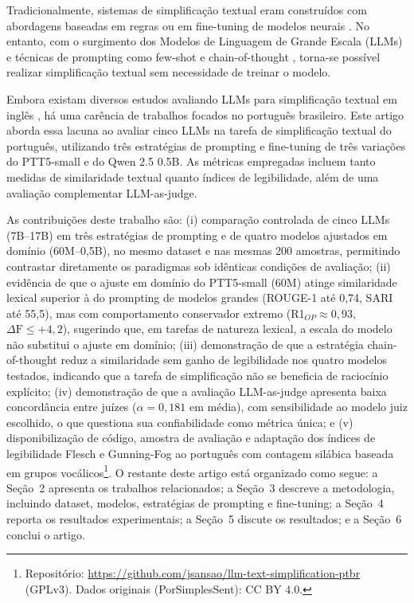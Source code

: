 \documentclass[a4paper, twocolumn, 11pt, twoside]{article}
\begin{document}
Tradicionalmente, sistemas de simplificação textual eram construídos com
abordagens baseadas em regras ou em fine-tuning de modelos neurais
\citep{nisioi2017}. No entanto, com o surgimento dos Modelos de Linguagem
de Grande Escala (LLMs) e técnicas de prompting como few-shot
\citep{brown2020} e chain-of-thought \citep{wei2022}, torna-se possível
realizar simplificação textual sem necessidade de treinar o modelo.

Embora existam diversos estudos avaliando LLMs para simplificação textual
em inglês \citep{feng2023,kew2023bless,agrawal2023controlling,farajidizaji2024},
há uma carência de trabalhos focados no português
brasileiro. Este artigo aborda essa lacuna ao avaliar cinco LLMs
na tarefa de simplificação textual do português, utilizando
três estratégias de prompting e fine-tuning de três variações do
PTT5-small e do Qwen 2.5 0.5B. As métricas empregadas incluem
tanto medidas de similaridade textual quanto índices de
legibilidade, além de uma avaliação complementar LLM-as-judge.

As contribuições deste trabalho são: (i) comparação controlada de
cinco LLMs (7B--17B) em três estratégias de prompting e de quatro
modelos ajustados em domínio (60M--0,5B), no mesmo dataset e nas
mesmas 200 amostras, permitindo contrastar diretamente os
paradigmas sob idênticas condições de avaliação; (ii) evidência
de que o ajuste em domínio do PTT5-small (60M) atinge similaridade
lexical superior à do prompting de modelos grandes
(ROUGE-1 até 0,74, SARI até 55,5), mas com
 comportamento conservador extremo
(R1$_{OP} \approx 0{,}93$, $\Delta \mathrm{F} \leq +4{,}2$),
sugerindo que, em tarefas de natureza lexical, a escala do modelo
não substitui o ajuste em domínio; (iii) demonstração de que a
estratégia chain-of-thought reduz a similaridade sem ganho de
legibilidade nos quatro modelos testados, indicando que a tarefa
de simplificação não se beneficia de raciocínio explícito;
(iv) demonstração de que a avaliação LLM-as-judge apresenta baixa
concordância entre juízes ($\alpha = 0{,}181$ em média), com
sensibilidade ao modelo juiz escolhido, o que questiona sua
confiabilidade como métrica única; e (v) disponibilização de
código, amostra de avaliação e adaptação dos índices de
legibilidade Flesch e Gunning-Fog ao português com contagem
silábica baseada em grupos vocálicos\footnote{%
  Repositório: \url{https://github.com/jsansao/llm-text-simplification-ptbr}
  (GPLv3). Dados originais (PorSimplesSent): CC BY 4.0.}. O restante deste
artigo está organizado como segue: a Seção~2 apresenta os trabalhos
relacionados; a Seção~3 descreve a metodologia, incluindo dataset,
modelos, estratégias de prompting e fine-tuning; a Seção~4 reporta os
resultados experimentais; a Seção~5 discute os resultados; e a
Seção~6 conclui o artigo.
\end{document}
